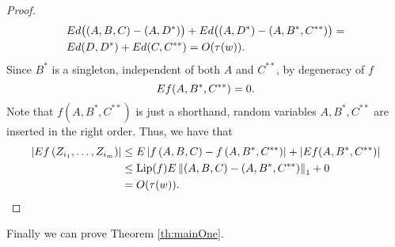 \begin{proof}
\begin{align*}
&E d \big( (A,B,C) - (A,D^*)\big) + E d\big((A,D^*) - (A,B^*,C^{**}) \big) =\\
&E d(D,D^*) + E d(C,C^{**}) = O(\tau(w)).
\end{align*}
Since $B^{*}$ is a singleton, independent of both $A$ and $C^{**}$, by degeneracy of $f$  
\begin{equation}
E f(A,B^{*},C^{**})=0.\label{eq: ABCLemma_property2}
\end{equation}
Note that $ f(A,B^{*},C^{**})$ is just a shorthand, random variables $A,B^{*},C^{**}$ are  inserted in the right order. Thus, we have that
\begin{align*}
\left|E f\left(Z_{i_{1}},\ldots,Z_{i_{m}}\right)\right| & \leq  E \left|f\left(A,B,C\right)-f\left(A,B^{*},C^{**}\right)\right|+\left|E f(A,B^{*},C^{**})\right|\\
 & \leq  \text{Lip}(f)E \left\Vert \left(A,B,C\right)-\left(A,B^{*},C^{**}\right)\right\Vert _{1}+0\\
&= O(\tau(w)).
\end{align*}
\end{proof}

Finally we can prove   Theorem \ref{th:mainOne}. 


